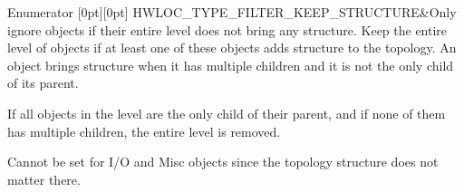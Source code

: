 \begin{DoxyEnumFields}{Enumerator}
[0pt][0pt]{}\mbox{\label{a00193_gga9a5a1f0140cd1952544477833733195ba7664716643bf1db83e631eed34f659e4}} 
H\+W\+L\+O\+C\+\_\+\+T\+Y\+P\+E\+\_\+\+F\+I\+L\+T\+E\+R\+\_\+\+K\+E\+E\+P\+\_\+\+S\+T\+R\+U\+C\+T\+U\+RE&Only ignore objects if their entire level does not bring any structure. Keep the entire level of objects if at least one of these objects adds structure to the topology. An object brings structure when it has multiple children and it is not the only child of its parent.

If all objects in the level are the only child of their parent, and if none of them has multiple children, the entire level is removed.

Cannot be set for I/O and Misc objects since the topology structure does not matter there. \\
\hline


\end{DoxyEnumFields}
